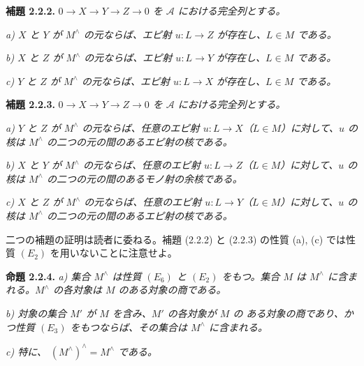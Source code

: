 \clearpage
{}%
\begingroup\small\setlength{\parskip}{0pt}\setlength{\emergencystretch}{1.5em}
\setlength{\abovedisplayskip}{4pt plus 2pt minus 2pt}%
\setlength{\belowdisplayskip}{4pt plus 2pt minus 2pt}%

\noindent\textbf{補題 2.2.2.}\quad
\textit{$0\longrightarrow X\longrightarrow Y\longrightarrow Z\longrightarrow0$
を $\mathcal A$ における完全列とする。}

\noindent\textit{a) $X$ と $Y$ が $M^{\wedge}$ の元ならば、エピ射
$u\colon L\longrightarrow Z$ が存在し、$L\in M$ である。}

\noindent\textit{b) $X$ と $Z$ が $M^{\wedge}$ の元ならば、エピ射
$u\colon L\longrightarrow Y$ が存在し、$L\in M$ である。}

\noindent\textit{c) $Y$ と $Z$ が $M^{\wedge}$ の元ならば、エピ射
$u\colon L\longrightarrow X$ が存在し、$L\in M$ である。}

\medskip\noindent\textbf{補題 2.2.3.}\quad
\textit{$0\longrightarrow X\longrightarrow Y\longrightarrow Z\longrightarrow0$
を $\mathcal A$ における完全列とする。}

\noindent\textit{a) $Y$ と $Z$ が $M^{\wedge}$ の元ならば、任意のエピ射
$u\colon L\longrightarrow X$（$L\in M$）に対して、$u$ の核は
$M^{\wedge}$ の二つの元の間のあるエピ射の核である。}

\noindent\textit{b) $X$ と $Y$ が $M^{\wedge}$ の元ならば、任意のエピ射
$u\colon L\longrightarrow Z$（$L\in M$）に対して、$u$ の核は
$M^{\wedge}$ の二つの元の間のあるモノ射の余核である。}

\noindent\textit{c) $X$ と $Z$ が $M^{\wedge}$ の元ならば、任意のエピ射
$u\colon L\longrightarrow Y$（$L\in M$）に対して、$u$ の核は
$M^{\wedge}$ の二つの元の間のあるエピ射の核である。}

二つの補題の証明は読者に委ねる。補題 (2.2.2) と (2.2.3) の性質
(a), (c) では性質 $(E_2)$ を用いないことに注意せよ。

\medskip\noindent\textbf{命題 2.2.4.}\quad
\textit{a) 集合 $M^{\wedge}$ は性質 $(E_6)$ と $(E_2)$ をもつ。集合
$M$ は $M^{\wedge}$ に含まれる。$M^{\wedge}$ の各対象は $M$ のある対象の商である。}

\noindent\textit{b) 対象の集合 $M'$ が $M$ を含み、$M'$ の各対象が $M$ の
ある対象の商であり、かつ性質 $(E_3)$ をもつならば、その集合は
$M^{\wedge}$ に含まれる。}

\noindent\textit{c) 特に、
$(M^{\wedge})^{\wedge}=M^{\wedge}$ である。}

